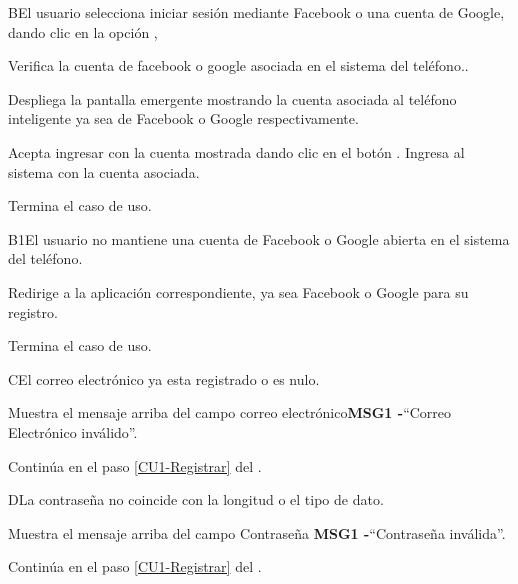 		\begin{UCtrayectoriaA}{B}{El usuario selecciona iniciar sesión mediante Facebook o una cuenta de Google, dando clic en la opción , }
			
			\UCpaso Verifica la cuenta de facebook o google asociada en el sistema del teléfono..
				
			\UCpaso Despliega la pantalla emergente  mostrando la cuenta asociada al teléfono inteligente ya sea de Facebook o Google respectivamente.
			
			\UCpaso[\UCactor] Acepta ingresar con la cuenta mostrada dando clic en el botón  .
			\UCpaso Ingresa al sistema con la cuenta asociada.
		
			\UCpaso Termina el caso de uso.
			
		\end{UCtrayectoriaA}
	
		\begin{UCtrayectoriaA}{B1}{El usuario no mantiene una cuenta de Facebook o Google abierta en el sistema del teléfono.}
		
		\UCpaso Redirige a la aplicación correspondiente, ya sea Facebook o Google para su registro.
		
		\UCpaso Termina el caso de uso.
		
	\end{UCtrayectoriaA}

		\begin{UCtrayectoriaA}{C}{El correo electrónico ya esta registrado o es nulo.}
			
			\UCpaso Muestra el mensaje arriba del campo correo electrónico{\bf MSG1 -}``Correo Electrónico inválido''.
			
			\UCpaso Continúa en el paso \ref{CU1-Registrar} del .
			
		\end{UCtrayectoriaA}

		\begin{UCtrayectoriaA}{D}{La contraseña no coincide con la longitud o el tipo de dato.}
			
			\UCpaso Muestra el mensaje arriba del campo Contraseña {\bf MSG1 -}``Contraseña inválida''.
				
			\UCpaso Continúa en el paso \ref{CU1-Registrar} del .
		
	\end{UCtrayectoriaA}

